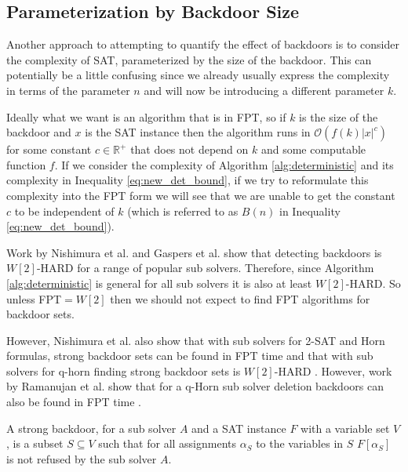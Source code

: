 \subsection{Parameterization by Backdoor Size}
Another approach to attempting to quantify the effect of backdoors is to
consider the complexity of SAT, parameterized by the size of the backdoor.
This can potentially be a little confusing since we already usually express
the complexity in terms of the parameter $n$ and will now be introducing
a different parameter $k$.


Ideally what we want is an algorithm that is in FPT, so
if $k$ is the size of the backdoor and $x$ is the SAT instance then the
algorithm runs in $\mathcal{O}(f(k)|x|^{c})$ for some constant $c \in \mathbb{R}^{+}$
that does not depend on $k$ and some computable function $f$.
If we consider the complexity of Algorithm \ref{alg:deterministic} and its
complexity in Inequality \ref{eq:new_det_bound}, if we try to reformulate
this complexity into the FPT form we will see that we are unable to get the
constant $c$ to be independent of $k$ (which is referred to as $B(n)$ in Inequality \ref{eq:new_det_bound}).

Work by Nishimura et al. \cite{nishimura2004detecting} and Gaspers et al.
\cite{gaspers2016backdoors} show that detecting backdoors is $W[2]$-HARD
for a range of popular sub solvers. Therefore, since Algorithm
\ref{alg:deterministic} is general for all sub solvers it is also at least
$W[2]$-HARD. So unless FPT$ = W[2]$ then we should not expect
to find FPT algorithms for backdoor sets.

However, Nishimura et al. also show that with sub solvers
for 2-SAT and Horn formulas, strong backdoor sets can be found in FPT time
and that with sub solvers for q-horn \cite{boros1994recognition} finding strong
backdoor sets is $W[2]$-HARD
\cite{nishimura2004detecting}. However, work by Ramanujan et al. show
that for a q-Horn sub solver deletion backdoors
can also be found in FPT time \cite{ramanujan2017linear}.

\begin{definition}
    A strong backdoor, for a sub solver $A$ and
    a SAT instance $F$ with a variable set $V$, is
    a subset $S \subseteq V$ such that for all assignments $\alpha_S$ to
    the variables in $S$ $F[\alpha_S]$ is not refused by the sub solver $A$.
\end{definition}

